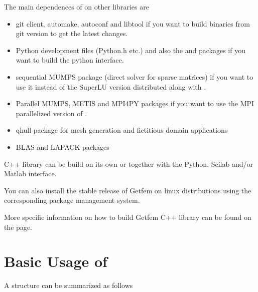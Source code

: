 \documentclass[a4paper,11pt,english]{sphinxmanual}
\begin{document}
The main dependences of  on other libraries are
\begin{itemize}
\item {} 
git client, automake, autoconf and libtool if you  want to build binaries
from git version to get the latest changes.

\item {} 
Python development files (Python.h etc.) and also the  and  packages if
you want to build the python interface.

\item {} 
sequential MUMPS package (direct solver for sparse matrices) if you want to use it instead of the SuperLU version distributed along with .

\item {} 
Parallel MUMPS, METIS and MPI4PY packages if you want to use the MPI parallelized version of .

\item {} 
qhull package for mesh generation and fictitious domain applications

\item {} 
BLAS and LAPACK packages

\end{itemize}

 C++ library can be build on its own or together with the Python, Scilab and/or Matlab interface.

You can also install the stable release of Getfem on linux distributions using the corresponding package management system.

More specific information on how to build Getfem C++ library can be found on the  page.


\chapter{Basic Usage of }
\label{\detokenize{tutorial/basic_usage:basic-usage-of-gf}}\label{\detokenize{tutorial/basic_usage:tut-bsic-usage}}\label{\detokenize{tutorial/basic_usage::doc}}
A  structure can be summarized as follows

\begin{figure}[htbp]
\centering

\noindent{}
\end{figure}
\end{document}
